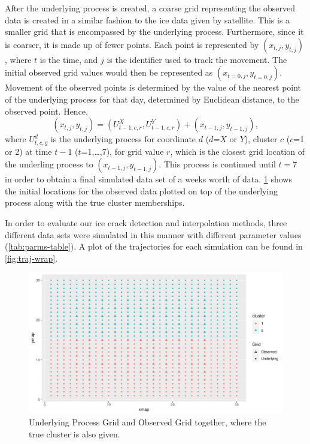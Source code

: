 \documentclass[12pt]{article}
\begin{document}
After the underlying process is created, a coarse grid representing the
observed data is created in a similar fashion to the ice data given by
satellite. This is a smaller grid that is encompassed by the underlying
process. Furthermore, since it is coarser, it is made up of fewer
points. Each point is represented by \((x_{t,j}, y_{t,j})\), where \(t\)
is the time, and \(j\) is the identifier used to track the movement. The
initial observed grid values would then be represented as
\((x_{t=0,j}, y_{t=0,j})\). Movement of the observed points is
determined by the value of the nearest point of the underlying process
for that day, determined by Euclidean distance, to the observed point.
Hence,
\[(x_{t,j}, y_{t,j}) = (U^{X}_{t-1,c,r}, U^{Y}_{t-1,c,r}) + (x_{t-1,j}, y_{t-1,j}),\]
where \(U^d_{t,c,g}\) is the underlying process for coordinate \(d\)
(\(d\)=\(X\) or \(Y\)), cluster \(c\) (\(c\)=1 or 2) at time \(t-1\)
(\(t\)=1,\ldots,7), for grid value \(r\), which is the closest grid
location of the underling process to \((x_{t-1,j}, y_{t-1,j})\). This
process is continued until \(t=7\) in order to obtain a final simulated
data set of a weeks worth of data. \cref{fig:grids-combined} shows the
initial locations for the observed data plotted on top of the underlying
process along with the true cluster memberships.

In order to evaluate our ice crack detection and interpolation methods,
three different data sets were simulated in this manner with different
parameter values (\cref{tab:parms-table}). A plot of the trajectories
for each simulation can be found in \cref{fig:traj-wrap}.

\begin{figure}[tbp]

{\centering \includegraphics[width=\linewidth,]{spatio-temporal-model-arctic-sea-ice_files/figure-latex/grids-combined-1} 

}

\caption[Simulation Grids]{Underlying Process Grid and Observed Grid together, where the true cluster is also given.}\label{fig:grids-combined}
\end{figure}
\end{document}
